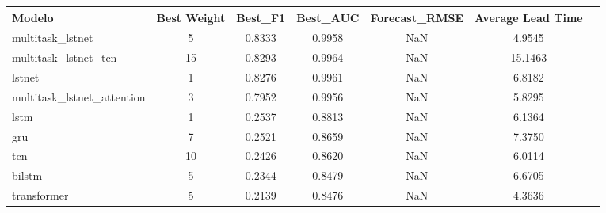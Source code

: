 \begin{tabular}{lcccccc}
\toprule
Modelo & Best Weight & Best_F1 & Best_AUC & Forecast_RMSE & Average Lead Time \\
\midrule
multitask_lstnet & 5 & 0.8333 & 0.9958 & NaN & 4.9545 \\
multitask_lstnet_tcn & 15 & 0.8293 & 0.9964 & NaN & 15.1463 \\
lstnet & 1 & 0.8276 & 0.9961 & NaN & 6.8182 \\
multitask_lstnet_attention & 3 & 0.7952 & 0.9956 & NaN & 5.8295 \\
lstm & 1 & 0.2537 & 0.8813 & NaN & 6.1364 \\
gru & 7 & 0.2521 & 0.8659 & NaN & 7.3750 \\
tcn & 10 & 0.2426 & 0.8620 & NaN & 6.0114 \\
bilstm & 5 & 0.2344 & 0.8479 & NaN & 6.6705 \\
transformer & 5 & 0.2139 & 0.8476 & NaN & 4.3636 \\
\bottomrule
\end{tabular}
